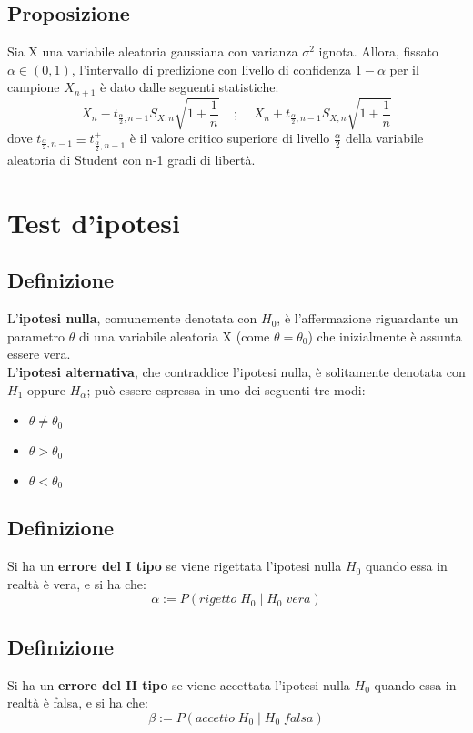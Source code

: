 \documentclass{article}
\begin{document}
\subsection*{Proposizione}
Sia X una variabile aleatoria gaussiana con varianza $\sigma^{2}$ ignota. Allora, fissato $\alpha \in (0,1)$, l'intervallo di predizione con livello di confidenza $1-\alpha$ per il campione $X_{n+1}$ è dato dalle seguenti statistiche:
\[ \overline{X}_{n} - t_{\frac{\alpha}{2},n-1} S_{X,n} \sqrt{1 + \frac{1}{n}} \; \; \; \; ; \; \; \; \; \overline{X}_{n} + t_{\frac{\alpha}{2},n-1} S_{X,n} \sqrt{1 + \frac{1}{n}} \]
dove $t_{\frac{\alpha}{2},n-1} \equiv t_{\frac{\alpha}{2},n-1}^{+}$ è il valore critico superiore di livello $\frac{\alpha}{2}$ della variabile aleatoria di Student con n-1 gradi di libertà.

\section*{Test d'ipotesi}
\subsection*{Definizione}
L'\textbf{ipotesi nulla}, comunemente denotata con $H_{0}$, è l'affermazione riguardante un parametro $\theta$ di una variabile aleatoria X (come $\theta = \theta_{0}$) che inizialmente è assunta essere vera.\\
L'\textbf{ipotesi alternativa}, che contraddice l'ipotesi nulla, è solitamente denotata con $H_{1}$ oppure $H_{\alpha}$; può essere espressa in uno dei seguenti tre modi:
\begin{itemize}
\item $\theta \neq \theta_{0}$
\item $\theta > \theta_{0}$
\item $\theta < \theta_{0}$
\end{itemize}

\subsection*{Definizione}
Si ha un \textbf{errore del I tipo} se viene rigettata l'ipotesi nulla $H_{0}$ quando essa in realtà è vera, e si ha che:
\[ \alpha := P(rigetto \;  H_{0} \; | \; H_{0} \; vera) \]

\subsection*{Definizione}
Si ha un \textbf{errore del II tipo} se viene accettata l'ipotesi nulla $H_{0}$ quando essa in realtà è falsa, e si ha che:
\[ \beta := P(accetto \;  H_{0} \; | \; H_{0} \; falsa) \]
\end{document}
